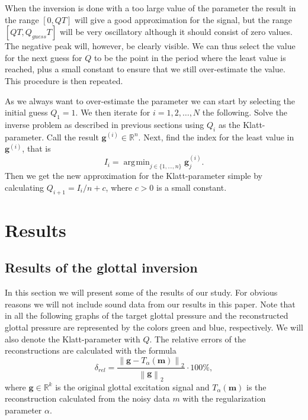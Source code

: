 \documentclass[12pt,a4]{article}
\DeclareMathOperator*{\argmin}{\arg\!\min}
\newcommand{\R}{{\mathbb R}}
\newcommand{\vc}[1]{\ensuremath{\bm{#1}}}
\begin{document}
When the inversion is done with a too large value of the parameter the result in the range $[0, QT]$ will give a good approximation for the signal, but the range $[QT, Q_{guess} T]$ will be very oscillatory although it should consist of zero values. The negative peak will, however, be clearly visible.  We can thus select the value for the next guess for $Q$ to be the point in the period where the least value is reached, plus a small constant to ensure that we still over-estimate the value. This procedure is then repeated.

As we always want to over-estimate the parameter we can start by selecting the initial guess $Q_1 = 1$. We then iterate for $i = 1, 2, \ldots, N$ the following. Solve the inverse problem as described in previous sections using $Q_i$ as the Klatt-parameter. Call the result $\vc{g}^{(i)} \in \R^n$. Next, find the index for the least value in $\vc{g}^{(i)}$, that is
\begin{equation*}
I_i = \argmin_{j \in \{1, \ldots, n\}} \vc{g}^{(i)}_j .
\end{equation*}
Then we get the new approximation for the Klatt-parameter simple by calculating $Q_{i+1} = I_i / n + c$, where $c > 0$ is a small constant.



\section{Results}
\label{sec:results}
\subsection{Results of the glottal inversion}
In this section we will present some of the results of our study. For obvious reasons we will not include sound data from our results in this paper. Note that in all the following graphs of the target glottal pressure and the reconstructed glottal pressure are represented by the colors green and blue, respectively. We will also denote the Klatt-parameter with $Q$. The relative errors of the reconstructions are calculated with the formula
\begin{equation}
\delta_{rel} = \frac{\left\| \vc{g} - T_{\alpha}(\vc{m}) \right\|_2}{\left\| \vc{g} \right\|_2} \cdot 100 \%,
\end{equation}
where $\vc{g} \in \R^k$ is the original glottal excitation signal and $T_{\alpha}(\vc{m})$ is the reconstruction calculated from the noisy data $m$ with the regularization parameter $\alpha$.
\end{document}
